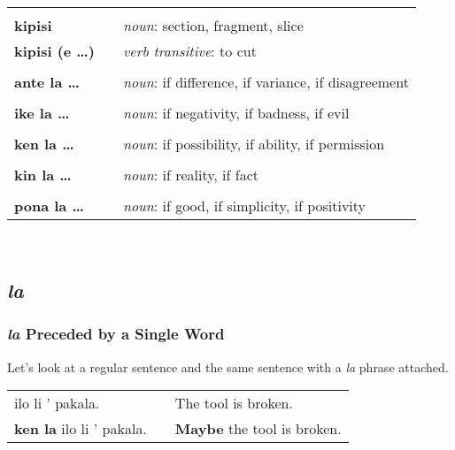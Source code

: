 \begin{supertabular}{p{2,5cm}|ll}
 && \\ %
\textbf{kipisi } && \textit{noun}: section, fragment, slice \\ %
\textbf{kipisi (e \dots)} && \textit{verb transitive}: to cut \\ %
 && \\ %
 \textbf{ante la \dots} && \textit{noun}: if difference, if variance, if disagreement  \\ %
 && \\ %
\textbf{ike la \dots} && \textit{noun}: if negativity, if badness, if evil \\ %
 && \\ %
\textbf{ken la \dots} && \textit{noun}: if possibility, if ability, if permission \\ %
 && \\ %
\textbf{kin la \dots} && \textit{noun}: if reality, if fact \\  %
 && \\ %
\textbf{pona la \dots} && \textit{noun}: if good, if simplicity, if positivity \\ %
\end{supertabular} \\
%
\subsection*{\textit{la}}
%
\subsubsection*{\textit{la} Preceded by a Single Word}
%
Let's look at a regular sentence and the same sentence with a \textit{la} phrase attached. 

\begin{supertabular}{p{5,5cm}|ll}
ilo li ' pakala. && The tool is broken. \\
\textbf{ken la} ilo li ' pakala. && \textbf{Maybe} the tool is broken. \\
\end{supertabular} 

